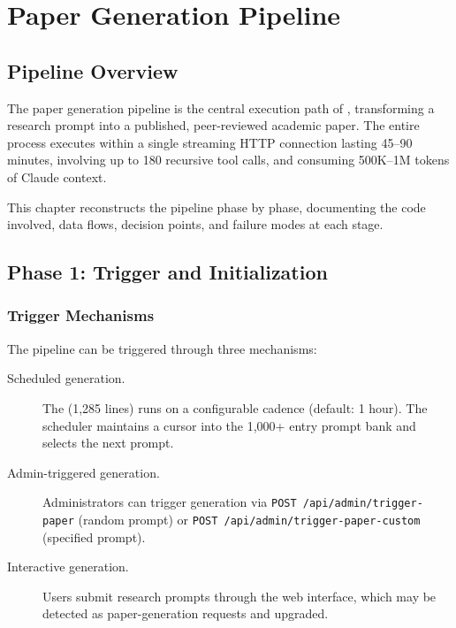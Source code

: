 \chapter{Paper Generation Pipeline}
\label{ch:pipeline}

\section{Pipeline Overview}
\label{sec:pipeline:overview}

The paper generation pipeline is the central execution path of \autoscholar, transforming a research prompt into a published, peer-reviewed academic paper.
The entire process executes within a single streaming HTTP connection lasting 45--90 minutes, involving up to 180 recursive tool calls, and consuming 500K--1M tokens of Claude context.

This chapter reconstructs the pipeline phase by phase, documenting the code involved, data flows, decision points, and failure modes at each stage.

\section{Phase 1: Trigger and Initialization}
\label{sec:pipeline:trigger}

\subsection{Trigger Mechanisms}

The pipeline can be triggered through three mechanisms:

\begin{description}
  \item[Scheduled generation.] The  (1,285 lines) runs on a configurable cadence (default: 1 hour). The scheduler maintains a cursor into the 1,000+ entry prompt bank and selects the next prompt.

  \item[Admin-triggered generation.] Administrators can trigger generation via \texttt{POST /api/admin/trigger-paper} (random prompt) or \texttt{POST /api/admin/trigger-paper-custom} (specified prompt).

  \item[Interactive generation.] Users submit research prompts through the web interface, which may be detected as paper-generation requests and upgraded.
\end{description}

